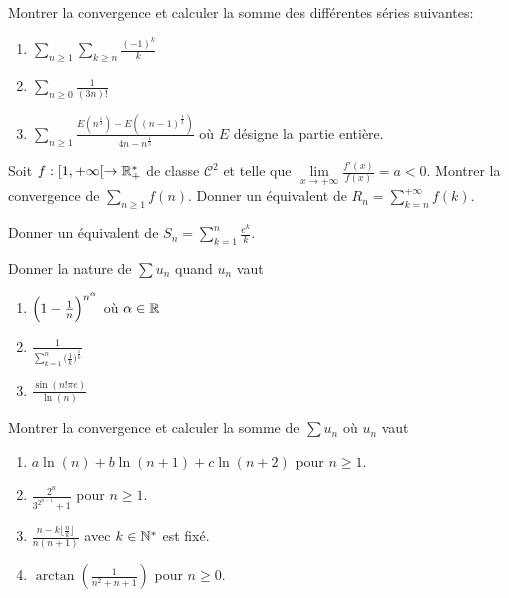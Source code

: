 \documentclass[12pt]{article}
\begin{document}
\begin{exercise}
	Montrer la convergence et calculer la somme des différentes séries suivantes:
	\begin{enumerate}
		\item
		$\sum_{n\geqslant1}\sum_{k\geqslant n}\frac{(-1)^{k}}{k}$
		\item
		$\sum_{n\geqslant0}\frac{1}{(3n)!}$
		\item
		$\sum_{n\geqslant1}\frac{E\left(n^{\frac{1}{3}}\right)-E\left(\left(n-1\right)^{\frac{1}{3}}\right)}{4n-n^{\frac{1}{3}}}$
		où $E$ désigne la partie entière.
	\end{enumerate}
\end{exercise}

\begin{exercise}
	Soit $f:[1,+\infty[\to\mathbb{R}_{+}^{*}$ de classe $\mathcal{C}^{2}$ et telle que
	$\lim\limits_{x\to+\infty}\frac{f'(x)}{f(x)}=a<0$. Montrer la convergence de
	$\sum_{n\geqslant1}f(n)$. Donner un équivalent de $R_{n}=\sum_{k=n}^{+\infty}
	f(k)$.
\end{exercise}

\begin{exercise}
	Donner un équivalent de $S_{n}=\sum_{k=1}^{n}\frac{e^{k}}{k}$.
\end{exercise}

\begin{exercise}
	Donner la nature de $\sum u_{n}$ quand $u_{n}$ vaut
	\begin{enumerate}
		\item
		$\Bigl(1-\frac{1}{n}\Bigr)^{n^{\alpha}}$ où $\alpha\in\mathbb{R}$
		\item
		$\frac{1}{\sum_{k=1}^{n}\bigl(\frac{1}{k}\bigr)^{\frac{1}{k}}}$
		\item
		$\frac{\sin(n!\pi e)}{\ln(n)}$
	\end{enumerate}
\end{exercise}

\begin{exercise}
	Montrer la convergence et calculer la somme de $\sum u_{n}$ où $u_{n}$ vaut
	\begin{enumerate}
		\item
		$a\ln(n)+b\ln(n+1)+c\ln(n+2)$ pour $n\geqslant1$.
		\item
		$\frac{2^{n}}{3^{2^{n-1}}+1}$ pour $n\geqslant 1$.
		\item
		$\frac{n-k\lfloor\frac{n}{k}\rfloor}{n(n+1)}$ avec $k\in\mathbb{N}^{*}$ est fixé.
		\item
		$\arctan(\frac{1}{n^{2}+n+1})$ pour $n\geqslant0$.
	\end{enumerate}
\end{exercise}
\end{document}
